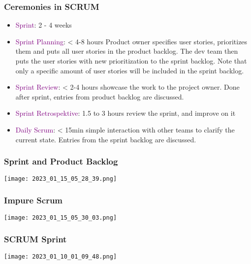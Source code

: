 \documentclass[main.tex,fontsize=12pt,paper=a4,paper=landscape,DIV=calc,]{scrartcl}
\begin{document}
\begin{multicols*}{2}
\subsubsection{Ceremonies in SCRUM}
\begin{itemize}
\item \textcolor{purple}{Sprint}: 2 - 4 weeks
\item \textcolor{purple}{Sprint Planning}: < 4-8 hours\newline
  Product owner specifies user stories, prioritizes them and puts all user stories in the product backlog.\newline
  The dev team then puts the user stories with new prioritization to the sprint backlog.\newline
  Note that only a specific amount of user stories will be included in the sprint backlog.
\item \textcolor{purple}{Sprint Review}: < 2-4 hours\newline
  showcase the work to the project owner. \newline
  Done after sprint, entries from product backlog are discussed.
\item \textcolor{purple}{Sprint Retrospektive}: 1.5 to 3 hours\newline
  review the sprint, and improve on it
\item \textcolor{purple}{Daily Scrum}: < 15min\newline
  simple interaction with other teams to clarify the current state.\newline
  Entries from the sprint backlog are discussed.
\end{itemize} 

\subsubsection{Sprint and Product Backlog}
\texttt{[image: 2023\_01\_15\_05\_28\_39.png]}

\subsubsection{Impure Scrum}
\texttt{[image: 2023\_01\_15\_05\_30\_03.png]}

\subsubsection{SCRUM Sprint}
\texttt{[image: 2023\_01\_10\_01\_09\_48.png]}


\end{multicols*}
\end{document}
